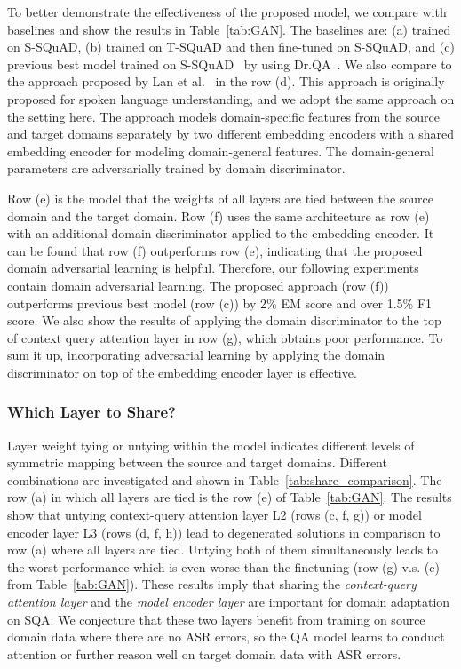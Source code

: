\documentclass{article}
\begin{document}
To better demonstrate the effectiveness of the proposed model, we compare with baselines and show the results in Table~\ref{tab:GAN}. 
The baselines are: (a) trained on S-SQuAD, (b) trained on T-SQuAD and then fine-tuned on S-SQuAD, and (c) previous best model trained on S-SQuAD~\cite{li2018spoken} by using Dr.QA~\cite{chen2017reading}.
We also compare to the approach proposed by Lan et al.~\cite{lan2018semi} in the row (d).
This approach is originally proposed for spoken language understanding, and we adopt the same approach on the setting here.
The approach models domain-specific features from the source and target domains separately by two different embedding encoders with a shared embedding encoder for modeling domain-general features.
The domain-general parameters are adversarially trained by domain discriminator. 


Row (e) is the model that the weights of all layers are tied between the source domain and the target domain. 
Row (f) uses the same architecture as row (e) with an additional domain discriminator applied to the embedding encoder.
It can be found that row (f) outperforms row (e), indicating that the proposed domain adversarial learning is helpful. Therefore, our following experiments contain domain adversarial learning. 
The proposed approach (row (f)) outperforms previous best model (row (c)) by 2\% EM score and over 1.5\% F1 score.
We also show the results of applying the domain discriminator to the top of context query attention layer in row (g), which obtains poor performance.
To sum it up, incorporating adversarial learning by applying the domain discriminator on top of the embedding encoder layer is effective. 





\subsubsection{Which Layer to Share?}
Layer weight tying or untying within the model indicates different levels of symmetric mapping between the source and target domains.
Different combinations are investigated and shown in Table~\ref{tab:share_comparison}. 
The row (a)  in which all layers are tied is the row (e) of Table~\ref{tab:GAN}. 
The results show that untying context-query attention layer L2 (rows (c, f, g)) or model encoder layer L3 (rows (d, f, h)) lead to degenerated solutions in comparison to row (a) where all layers are tied. 
Untying both of them simultaneously leads to the worst performance which is even worse than the finetuning (row (g) v.s. (c) from Table~\ref{tab:GAN}). 
These results imply that sharing the \emph{context-query attention layer} and the \emph{model encoder layer} are important for domain adaptation on SQA. 
We conjecture that these two layers benefit from training on source domain data where there are no ASR errors, so the QA model learns to conduct attention or further reason well on target domain data with ASR errors.
\end{document}
